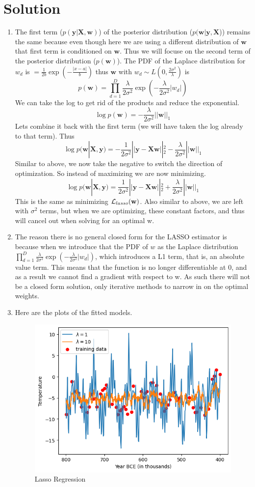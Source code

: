 \documentclass[submit]{harvardml}
\newenvironment{solution}
  {\color{blue}\section*{Solution}}
{}
\begin{document}
\begin{solution}
\begin{enumerate}
            \item 
            The first term ($p(\textbf{y}|\textbf{X}, \textbf{w})$) of the posterior distribution ($p(\textbf{w}|\textbf{y}, \textbf{X}$)) remains the same because even though here we are using a different distribution of $\textbf{w}$ that first term is conditioned on $\textbf{w}$. Thus we will focuse on the second term of the posterior distribution ($p(\textbf{w})$). The PDF of the Laplace distribution for $w_d$ is $=\frac{1}{2b}\exp(-\frac{|x-a|}{b})$
            thus $\textbf{w}$ with $w_d \sim L\left(0,\frac{2\sigma^2}{\lambda}\right)$ is
            $$p(\textbf{w}) = \prod_{d=1}^D\frac{\lambda}{2\sigma^2}\exp(-\frac{\lambda}{2\sigma^2}|w_d|)$$
            We can take the log to get rid of the products and reduce the exponential. 
            $$\log p(\textbf{w}) = - \frac{\lambda}{2\sigma^2}||\textbf{w}||_1$$
            Lets combine it back with the first term (we will have taken the log already to that term). Thus
            $$\log p(\textbf{w}|\textbf{X},\textbf{y}) = -\frac{1}{2\sigma^2}||\textbf{y}-\textbf{Xw}||^2_2-\frac{\lambda}{2\sigma^2}||\textbf{w}||_1$$
            Similar to above, we now take the negative to switch the direction of optimization. So instead of maximizing we are now minimizing. 
            $$\log p(\textbf{w}|\textbf{X},\textbf{y}) = \frac{1}{2\sigma^2}||\textbf{y}-\textbf{Xw}||^2_2+\frac{\lambda}{2\sigma^2}||\textbf{w}||_1$$
            This is the same as minimizing $\mathcal{L}_{lasso}(\mathbf{w})$. Also similar to above, we are left with $\sigma^2$ terms, but when we are optimizing, these constant factors, and thus will cancel out when solving for an optimal w.
            \item The reason there is no general closed form for the LASSO estimator is because when we introduce that the PDF of $w$ as the Laplace distribution $\prod_{d=1}^D\frac{\lambda}{2\sigma^2}\exp(-\frac{\lambda}{2\sigma^2}|w_d|)$, which introduces a L1 term, that is, an absolute value term. This means that the function is no longer differentiable at 0, and as a result we cannot find a gradient with respect to w. As such there will not be a closed form solution, only iterative methods to narrow in on the optimal weights. 

            \item Here are the plots of the fitted models. 
            \begin{figure}[htp]
                \centering
                \includegraphics[width=0.5\linewidth]{img_output/p4.5.png}
                \caption{Lasso Regression}
                \label{fig:enter-label}
            \end{figure}


\end{enumerate}
\end{solution}
\end{document}
